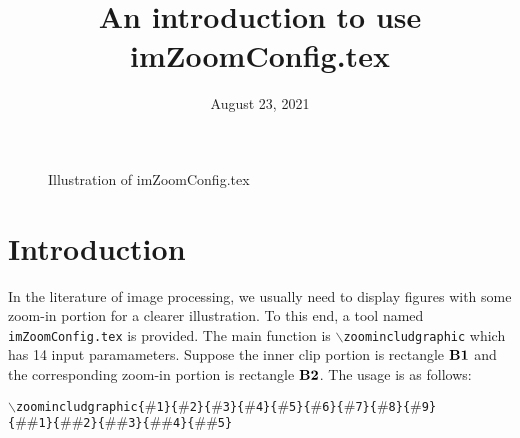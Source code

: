 \documentclass[11pt]{article}
\begin{document}
\date{August 23, 2021}
\title{An introduction to use imZoomConfig.tex}
\maketitle

\begin{figure}[!ht]
\centering
	\caption{Illustration of imZoomConfig.tex}
	\label{illus}
\end{figure}

\section{Introduction}

In the literature of image processing, we usually need to display figures with some zoom-in portion for a clearer illustration. To this end, a tool named \texttt{imZoomConfig.tex} is provided. The main function is \texttt{$\backslash$zoomincludgraphic} which has 14 input paramameters. Suppose the inner clip portion is rectangle $\rm\bf{B}1$ and the corresponding zoom-in portion is rectangle $\rm\bf{B}2$. The usage is as follows:

\texttt{$\backslash$zoomincludgraphic\{$\#$1\}\{$\#$2\}\{$\#$3\}\{$\#$4\}\{$\#$5\}\{$\#$6\}\{$\#$7\}\{$\#$8\}\{$\#$9\}}\\ \texttt{\{$\#\#$1\}\{$\#\#$2\}\{$\#\#$3\}\{$\#\#$4\}\{$\#\#$5\}} 
\end{document}
